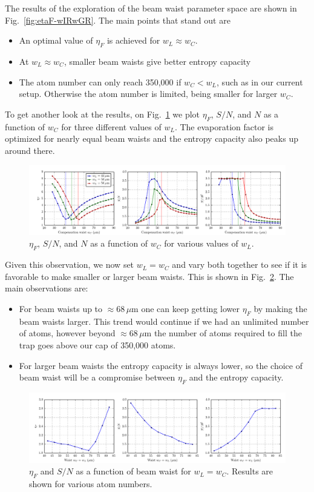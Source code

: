 \documentclass[11pt,letter]{article}
\begin{document}
The results of the
exploration of the beam waist parameter space are shown in
Fig.~\ref{fig:etaF-wIRwGR}.  The main points that stand out are
\begin{itemize}
\item  An optimal value of $\eta_{F}$ is achieved for $w_{L}\approx w_{C}$.  
\item  At $w_{L} \approx w_{C}$, smaller beam waists give better entropy capacity 
\item The atom number can only reach 350,000 if $w_{C} < w_{L}$, such as in our
current setup.  Otherwise the atom number is limited, being smaller for larger
$w_{C}$.
\end{itemize}


To get another look at the results, on Fig.~\ref{fig:etaF-wIRwGR-lines} we plot
$\eta_{F}$, $S/N$, and $N$  as a function of $w_{C}$ for three different values
of $w_{L}$.  The evaporation factor is optimized for nearly equal beam waists
and the entropy capacity also peaks up around there. 
\begin{figure}
    \centering
\includegraphics[width=\textwidth]{figures/etaF-wIRwGR-lines.png} \caption{
$\eta_{F}$, $S/N$, and $N$ as a function of $w_{C}$ for various values of $w_{L}$.  }
\label{fig:etaF-wIRwGR-lines}
\end{figure}
Given this observation,  we now set $w_{L}=w_{C}$ and vary both together  to see
if it is favorable to make smaller or larger beam waists.  This is shown in
Fig.~\ref{fig:etaF-wIR=wGR}.  The main observations are:
\begin{itemize}
\item  For beam waists up to $\approx68\,\mu$m one can keep getting lower
$\eta_{F}$ by making the beam waists larger.  This trend would continue if we
had an unlimited number of atoms, however beyond $\approx68\,\mu$m the number
of atoms required to fill the trap goes above our cap of 350,000 atoms.  
\item
For larger beam waists the entropy capacity is always lower, so the choice of
beam waist will be a compromise between $\eta_{F}$ and the entropy capacity. 
\end{itemize} 
\begin{figure}
    \centering \includegraphics[width=\textwidth]{figures/etaF-wIR=wGR.png}
\caption{ $\eta_{F}$ and $S/N$ as a function of beam waist for $w_{L}=w_{C}$.
Results are shown for various atom numbers.  }
\label{fig:etaF-wIR=wGR}
\end{figure}
\end{document}
